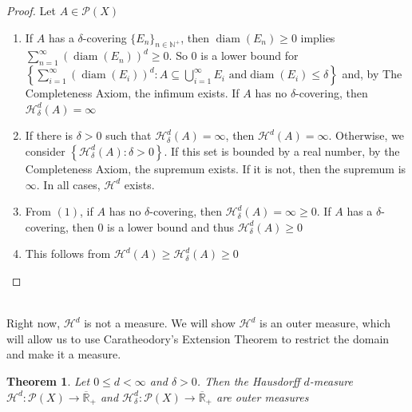 \documentclass{article}
\theoremstyle{plain}
\newtheorem{thm}{Theorem}[section]
\theoremstyle{definition}
\DeclareMathOperator{\diam}{diam}
\theoremstyle{remark}
\begin{document}
\begin{proof} Let $A \in \mathcal{P}(X)$
    \begin{enumerate}[label=(\arabic*)]
    \item If $A$ has a $\delta$-covering $\{E_n\}_{n\in \mathbb{N}^+}$, then $\diam (E_n) \ge 0$ implies $\sum \limits _{n=1}^\infty (\diam (E_n))^d \ge 0$. So $0$ is a lower bound for $\left\{\sum \limits _{i =1}^\infty (\diam (E_i))^d : A \subseteq \bigcup \limits _{i=1}^\infty E_i \text { and} \diam(E_i) \le \delta \right\}$ and, by The Completeness Axiom, the infimum exists. If $A$ has no $\delta$-covering, then $\mathcal{H}^d_\delta(A)=\infty$
    \item If there is $\delta >0$ such that $\mathcal{H}^d_\delta (A) = \infty$, then $\mathcal{H}^d(A) = \infty$. Otherwise, we consider $\left \{\mathcal{H}^d_\delta (A):\delta >0 \right \}$. If this set is bounded by a real number, by the Completeness Axiom, the supremum exists. If it is not, then the supremum is $\infty$. In all cases, $\mathcal{H}^d$ exists.
    
    \item From $(1)$, if $A$ has no $\delta$-covering, then $\mathcal{H}^d_\delta(A)=\infty \ge 0$. If $A$ has a $\delta$-covering, then $0$ is a lower bound and thus $\mathcal{H}^d_\delta (A)\ge 0$
        \item This follows from $\mathcal{H}^d(A) \ge \mathcal{H}^d_\delta(A)\ge 0$
    \end{enumerate}
\end{proof}
~\\Right now, $\mathcal{H}^d$ is not a measure. We will show $\mathcal{H}^d$ is an outer measure, which will allow us to use Caratheodory's Extension Theorem to restrict the domain and make it a measure.

\begin{thm}
    Let $0\le d<\infty$ and $\delta >0$. Then the Hausdorff $d$-measure $\mathcal{H}^d:\mathcal{P}(X) \to \overline{\mathbb{R}}_+$ and $\mathcal{H}^d_\delta :\mathcal{P}(X) \to \overline{\mathbb{R}}_+$ are outer measures
\end{thm}
\end{document}
